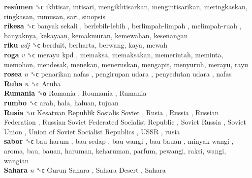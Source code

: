 \textbf{resúmen} ␝ϲ  ikhtisar, intisari, mengikhtisarkan, mengintisarikan, meringkaskan, ringkasan, rumusan, sari, sinopsis  \\
\textbf{rikesa} ␝ϲ   banyak sekali ,  berlebih-lebih ,  berlimpah-limpah ,  melimpah-ruah , banyaknya, kekayaan, kemakmuran, kemewahan, kesenangan  \\
\textbf{riku} \emph{adj}  ␝ϲ  berduit, berharta, berwang, kaya, mewah  \\
\textbf{roga} \emph{v}  ␝ϲ   merayu kpd , memaksa, memaksakan, memerintah, meminta, memohon, mendesak, menekan, meneruskan, mengapit, menyuruh, merayu, rayu  \\
\textbf{rosea} \emph{n}  ␝ϲ   penarikan nafas ,  pengirupan udara ,  penyedutan udara , nafas  \\
\textbf{Ruba} \emph{n}  ␝ϲ   Aruba   \\
\textbf{Rumania} ␝α   Romania ,  Roumania ,  Rumania   \\
\textbf{rumbo} ␝ϲ  arah, hala, haluan, tujuan  \\
\textbf{Rusia} ␝α   Kesatuan Republik Sosialis Soviet ,  Rusia ,  Russia ,  Russian Federation ,  Russian Soviet Federated Socialist Republic ,  Soviet Russia ,  Soviet Union ,  Union of Soviet Socialist Republics ,  USSR , rusia  \\
\textbf{sabor} ␝ϲ   bau harum ,  bau sedap ,  bau wangi ,  bau-bauan ,  minyak wangi , aroma, bau, bauan, haruman, keharuman, parfum, pewangi, raksi, wangi, wangian  \\
\textbf{Sahara} \emph{n}  ␝ϲ   Gurun Sahara ,  Sahara Desert ,  Sahara   \\
